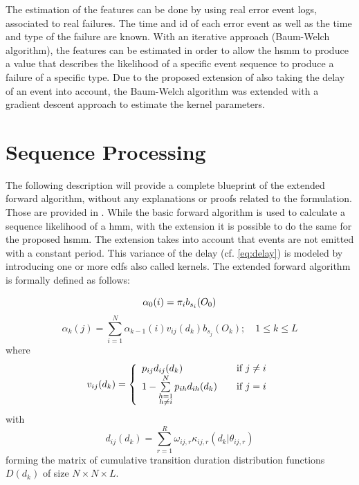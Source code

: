 \documentclass[mscthesis]{usiinfthesis}
\begin{document}
The estimation of the features can be done by using real error event logs,
associated to real failures. The time and id of each error event as well as the
time and type of the failure are known. With an iterative approach (Baum-Welch
algorithm), the features can be estimated in order to allow the \gls{hsmm} to
produce a value that describes the likelihood of a specific event sequence to
produce a failure of a specific type. Due to the proposed extension of also
taking the delay of an event into account, the Baum-Welch algorithm was
extended with a gradient descent approach to estimate the kernel parameters.

\section{Sequence Processing}
\label{ch:event_sequ}

The following description will provide a complete blueprint of the extended
forward algorithm, without any explanations or proofs related to the
formulation. Those are provided in \cite{salfner08}. While the basic forward
algorithm is used to calculate a sequence likelihood of a \gls{hmm}, with the
extension it is possible to do the same for the proposed \gls{hsmm}. The
extension takes into account that events are not emitted with a constant period.
This variance of the delay (cf. \ref{eq:delay}) is modeled by introducing
one or more \glspl{cdf} also called kernels. The extended forward algorithm is
formally defined as follows:

\begin{equation}
    \label{eq:forward_init}
    \alpha_0(i) = \pi_{i}b_{s_i}(O_0) \\
\end{equation}
\begin{equation}
    \label{eq:forward}
    \alpha_k(j) = \sum_{i=1}^{N} \alpha_{k-1}(i) v_{ij}(d_k) b_{s_j}(O_k);
    \quad 1 \leq k \leq L
\end{equation}
where
\begin{equation}
    \label{eq:V}
    v_{ij}(d_k) = \left\{
        \begin{array}{l l}
            p_{ij} d_{ij}(d_k)
                & \quad \text{if $j \neq i$}\\
            1 - \sum\limits_{\substack{h=1 \\ h \neq i}}^{N} p_{ih} d_{ih}(d_k)
                & \quad \text{if $j = i$}
        \end{array} \right.
\end{equation}
with
\begin{equation}
    \label{eq:D}
    d_{ij}(d_k) = \sum_{r=1}^{R} \omega_{ij,r}\kappa_{ij,r}(d_k|\theta_{ij, r})
\end{equation}
forming the matrix of cumulative transition duration distribution functions
$ D(d_k) $ of size $ N \times N \times L $.
\end{document}
